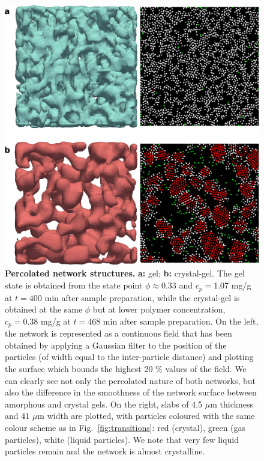 \documentclass[preprint,amsmath,amssymb,superscriptaddress]{revtex4-1}
\begin{document}
\begin{figure}[!t]
 \centering
 \includegraphics[width=12cm]{fig2}
\caption{{\bf Percolated network structures.} {\bf a:} gel; {\bf b:} crystal-gel. The gel state is obtained from the state
point $\phi\approx 0.33$ and $c_p=1.07$ mg/g at $t=400$ min after sample preparation, while the crystal-gel is obtained at the same $\phi$ but
at lower polymer concentration, $c_p=0.38$ mg/g at $t=468$ min after sample preparation. On the left, the network is represented as a continuous field that has
been obtained by applying a Gaussian filter to the position of the particles (of width equal to the inter-particle distance) and
plotting the surface which bounds the highest 20 \% values of the field. We can clearly see not only the percolated nature of both networks, 
but also the difference in the smoothness of the network surface between amorphous and crystal gels. 
On the right, slabs of 4.5 $\mu$m thickness and 41 $\mu$m width are plotted,
with particles coloured with the same colour scheme as in Fig.~\ref{fig:transitions}: red (crystal), green (gas particles), white (liquid particles). 
We note that very few liquid particles remain and the network is almost crystalline. 
} 
\label{fig:network}
\end{figure}

\clearpage
\end{document}
